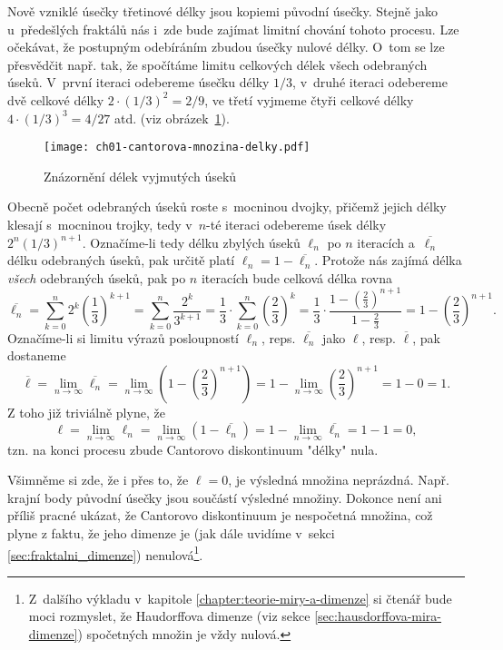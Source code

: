Nově vzniklé úsečky třetinové délky jsou kopiemi původní úsečky. Stejně jako u~předešlých fraktálů nás i~zde bude zajímat limitní chování tohoto procesu. Lze očekávat, že postupným odebíráním zbudou úsečky nulové délky. O~tom se lze přesvědčit např. tak, že spočítáme limitu celkových délek všech odebraných úseků. V~první iteraci odebereme úsečku délky $1/3$, v~druhé iteraci odebereme dvě celkové délky $2\cdot(1/3)^2=2/9$, ve třetí vyjmeme čtyři celkové délky $4\cdot(1/3)^3=4/27$ atd. (viz obrázek~\ref{fig:cantorovo_diskontinuum_delky}).
\begin{figure}[h]
    \centering
    \texttt{[image: ch01-cantorova-mnozina-delky.pdf]}
    \caption{Znázornění délek vyjmutých úseků}
    \label{fig:cantorovo_diskontinuum_delky}
\end{figure}
Obecně počet odebraných úseků roste s~mocninou dvojky, přičemž jejich délky klesají s~mocninou trojky, tedy v~$n$-té iteraci odebereme úsek délky $2^n(1/3)^{n+1}$. Označíme-li tedy délku zbylých úseků $\ell_n$ po $n$ iteracích a~$\overline{\ell_n}$ délku odebraných úseků, pak určitě platí $\ell_n=1-\overline{\ell_n}$. Protože nás zajímá délka \emph{všech} odebraných úseků, pak po $n$ iteracích bude celková délka rovna
\begin{equation}
    \overline{\ell_n}=\sum_{k=0}^{n}2^k\left(\dfrac{1}{3}\right)^{k+1}=\sum_{k=0}^{n}\dfrac{2^k}{3^{k+1}}=\dfrac{1}{3}\cdot\sum_{k=0}^{n}\left(\dfrac{2}{3}\right)^k=\dfrac{1}{3}\cdot\dfrac{1-\left(\frac{2}{3}\right)^{n+1}}{1-\frac{2}{3}}=1-\left(\dfrac{2}{3}\right)^{n+1}.
\end{equation}
Označíme-li si limitu výrazů posloupností $\ell_n$, reps. $\overline{\ell_n}$ jako $\ell$, resp. $\overline{\ell}$, pak dostaneme
\begin{equation*}
    \overline{\ell}=\lim_{n\to\infty}\overline{\ell_n}=\lim_{n\to\infty}\left(1-\left(\dfrac{2}{3}\right)^{n+1}\right)=1-\lim_{n\to\infty}\left(\dfrac{2}{3}\right)^{n+1}=1-0=1.
\end{equation*}
Z toho již triviálně plyne, že
\begin{equation}
    \ell=\lim_{n\to\infty}\ell_n=\lim_{n\to\infty}(1-\overline{\ell_n})=1-\lim_{n\to\infty}\overline{\ell_n}=1-1=0,
\end{equation}
tzn. na konci procesu zbude Cantorovo diskontinuum "délky" nula.

Všimněme si zde, že i přes to, že $\ell=0$, je výsledná množina neprázdná. Např. krajní body původní úsečky jsou součástí výsledné množiny. Dokonce není ani příliš pracné ukázat, že Cantorovo diskontinuum je nespočetná množina, což plyne z faktu, že jeho dimenze je (jak dále uvidíme v~sekci \ref{sec:fraktalni_dimenze}) nenulová\footnote{Z~dalšího výkladu v~kapitole \ref{chapter:teorie-miry-a-dimenze} si čtenář bude moci rozmyslet, že Haudorffova dimenze (viz sekce \ref{sec:hausdorffova-mira-dimenze}) spočetných množin je vždy nulová.}.